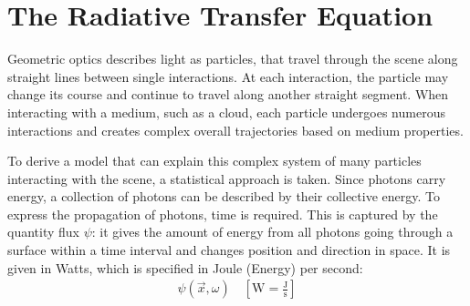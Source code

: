 \section{The Radiative Transfer Equation}

Geometric optics describes light as particles, that travel through the scene along straight lines between single interactions. At each interaction, the particle may change its course and continue to travel along another straight segment. When interacting with a medium, such as a cloud, each particle undergoes numerous interactions and creates complex overall trajectories based on medium properties.

To derive a model that can explain this complex system of many particles interacting with the scene, a statistical approach is taken. Since photons carry energy, a collection of photons can be described by their collective energy. To express the propagation of photons, time is required. This is captured by the quantity flux $\psi$: it gives the amount of energy from all photons going through a surface within a time interval and changes position and direction in space. It is given in Watts, which is specified in Joule (Energy) per second:
\begin{align*}
\psi\left(\vec{x}, \omega\right)
\quad
\left[\si{\watt} = \frac{\si{\joule}}{\si{\second}}\right]
\end{align*}

